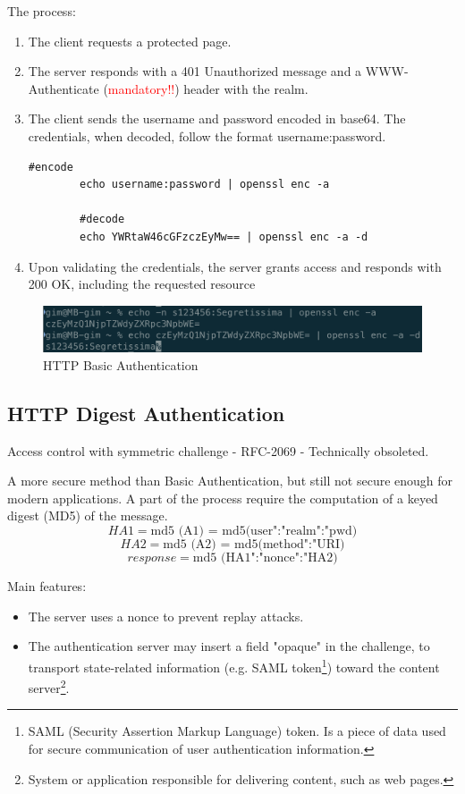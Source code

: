 The process:
\begin{enumerate}
    \item The client requests a protected page.
    \item The server responds with a 401 Unauthorized message and a WWW-Authenticate (\textcolor{Red}{mandatory!!}) header with the realm.
    \item The client sends the username and password encoded in base64. The credentials, when decoded, follow the format username:password.
    \begin{lstlisting}[style=bashStyle]
        #encode
        echo username:password | openssl enc -a 

        #decode
        echo YWRtaW46cGFzczEyMw== | openssl enc -a -d
    \end{lstlisting}
    \item Upon validating the credentials, the server grants access and responds with 200 OK, including the requested resource
\end{enumerate}

\begin{figure}[H]
    \centering
    \includegraphics[width=0.6\linewidth]{Images/Appsec/basic_authN.png}
    \caption{HTTP Basic Authentication}
\end{figure}

\subsection{HTTP Digest Authentication}
\begin{center}
    Access control with symmetric challenge - RFC-2069 - Technically obsoleted.
\end{center}
A more secure method than Basic Authentication, but still not secure enough for modern applications. A part of the process require the computation of a keyed digest (MD5) of the message.
\[
    HA1 = \text{md5 (A1) = md5(user":"realm":"pwd)}
\]
\[
    HA2 = \text{md5 (A2) = md5(method":"URI)}
\]
\[
    response = \text{md5 (HA1":"nonce":"HA2)}
\]

Main features:
\begin{itemize}
    \item The server uses a nonce to prevent replay attacks.
    \item The authentication server may insert a field "opaque" in the challenge, to transport state-related information (e.g. SAML token\footnote{SAML (Security Assertion Markup Language) token. Is a piece of data used for secure communication of user authentication information.}) toward the content server\footnote{System or application responsible for delivering content, such as web pages.}.
\end{itemize}

